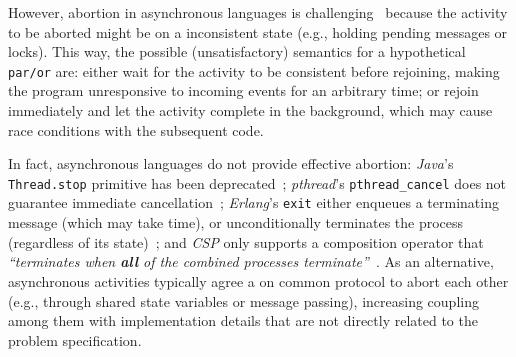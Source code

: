 \documentclass{acm_proc_article-sp}
\newcommand{\CEU}{\textsc{C\'{e}u}\xspace}
\newcommand{\code}[1] {{\small{\texttt{#1}}}}
\newcommand{\1}{\;}
\newcommand{\2}{\;\;}
\newcommand{\3}{\;\;\;}
\newcommand{\5}{\;\;\;\;\;}
\begin{document}


However, abortion in asynchronous languages is 
challenging~\cite{esterel.preemption} because the activity to be aborted might 
be on a inconsistent state (e.g., holding pending messages or locks).
%
This way, the possible (unsatisfactory) semantics for a hypothetical 
\code{par/or} are:
either wait for the activity to be consistent before rejoining, making the 
program unresponsive to incoming events for an arbitrary time;
or rejoin immediately and let the activity complete in the background, which 
may cause race conditions with the subsequent code.


In fact, asynchronous languages do not provide effective abortion:
\emph{Java}'s \code{Thread.stop} primitive has been 
deprecated~\cite{sync_async.threadsstop};
\emph{pthread}'s \code{pthread\_cancel} does not guarantee immediate 
cancellation~\cite{sync_async.pthreadsstop};
\emph{Erlang}'s \code{exit} either enqueues a terminating message (which may 
take time), or unconditionally terminates the process (regardless of its 
state)~\cite{sync_async.erlangstop};
and \emph{CSP} only supports a composition operator that \emph{``terminates 
when \textbf{all} of the combined processes terminate''}~\cite{async.csp}.
%
As an alternative, asynchronous activities typically agree a on common protocol 
to abort each other (e.g., through shared state variables or message passing), 
increasing coupling among them with implementation details that are not 
directly related to the problem specification.

%
\end{document}

